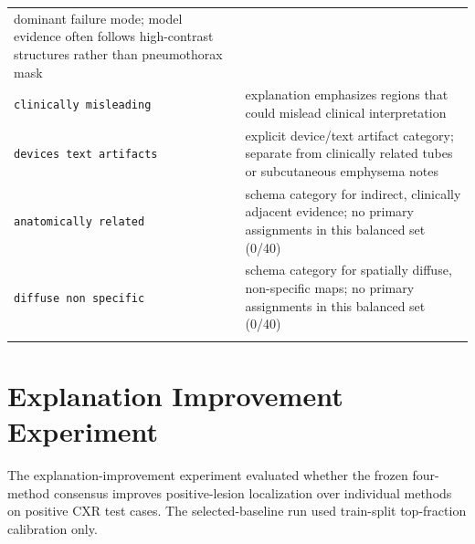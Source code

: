 \begin{longtable}[]{@{}ll@{}}
\begin{minipage}[t]{0.65\columnwidth}
		dominant failure mode; model evidence often follows high-contrast
		structures rather than pneumothorax mask\strut
	\end{minipage}\tabularnewline
	\begin{minipage}[t]{0.3\columnwidth}\raggedright
		\texttt{clinically \allowbreak misleading}\strut
	\end{minipage} & \begin{minipage}[t]{0.65\columnwidth}\raggedright
		explanation emphasizes regions that could mislead clinical
		interpretation\strut
	\end{minipage}\tabularnewline
	\begin{minipage}[t]{0.3\columnwidth}\raggedright
		\texttt{devices \allowbreak text \allowbreak artifacts}\strut
	\end{minipage} & \begin{minipage}[t]{0.65\columnwidth}\raggedright
		explicit device/text artifact category; separate from clinically related
		tubes or subcutaneous emphysema notes\strut
	\end{minipage}\tabularnewline
	\begin{minipage}[t]{0.3\columnwidth}\raggedright
		\texttt{anatomically \allowbreak related}\strut
	\end{minipage} & \begin{minipage}[t]{0.65\columnwidth}\raggedright
		schema category for indirect, clinically adjacent evidence; no primary
		assignments in this balanced set (0/40)\strut
	\end{minipage}\tabularnewline
	\begin{minipage}[t]{0.3\columnwidth}\raggedright
		\texttt{diffuse \allowbreak non \allowbreak specific}\strut
	\end{minipage} & \begin{minipage}[t]{0.65\columnwidth}\raggedright
		schema category for spatially diffuse, non-specific maps; no primary
		assignments in this balanced set (0/40)\strut
	\end{minipage}\tabularnewline
	\bottomrule
	\label{table:4-5}
\end{longtable}

\hypertarget{explanation-improvement-experiment}{%
	\section{Explanation Improvement
		Experiment}\label{explanation-improvement-experiment}}

The explanation-improvement experiment evaluated whether the
frozen four-method consensus improves positive-lesion localization over
individual methods on positive CXR test cases. The
selected-baseline run used train-split top-fraction calibration only.

